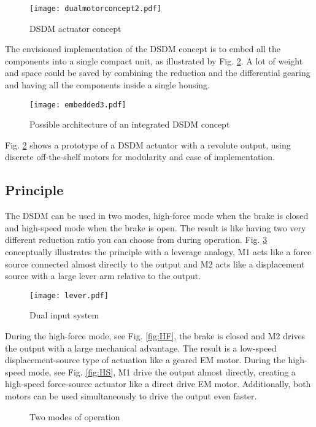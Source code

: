 \begin{figure}[H]
	\centering
		\texttt{[image: dualmotorconcept2.pdf]}
	\caption{DSDM actuator concept}
	\label{fig:dualmotorconcept}
\end{figure}

The envisioned implementation of the DSDM concept is to embed all the components into a single compact unit, as illustrated by Fig. \ref{fig:embedded}. A lot of weight and space could be saved by combining the reduction and the differential gearing and having all the components inside a single housing. 


\begin{figure}[H]
	\centering
		\texttt{[image: embedded3.pdf]}
	\caption{Possible architecture of an integrated DSDM concept}
	\label{fig:embedded}
\end{figure}

Fig. \ref{fig:embedded} shows a prototype of a DSDM actuator with a revolute output, using discrete off-the-shelf motors for modularity and ease of implementation.


\subsection{Principle}
\label{sec:princ}



The DSDM can be used in two modes, high-force mode when the brake is closed and high-speed mode when the brake is open. The result is like having two very different reduction ratio you can choose from during operation. Fig. \ref{fig:lever} conceptually illustrates the principle with a leverage analogy, M1 acts like a force source connected almost directly to the output and M2 acts like a displacement source with a large lever arm relative to the output. 
%
\begin{figure}[H]
	\centering
		\texttt{[image: lever.pdf]}
	\caption{Dual input system}
	\label{fig:lever}
\end{figure}
%
During the high-force mode, see Fig. \ref{fig:HF}, the brake is closed and M2 drives the output with a large mechanical advantage. The result is a low-speed displacement-source type of actuation like a geared EM motor. During the high-speed mode, see Fig. \ref{fig:HS}, M1 drive the output almost directly, creating a high-speed force-source actuator like a direct drive EM motor. Additionally, both motors can be used simultaneously to drive the output even faster.
%
\begin{figure}[H]
        \centering
        \caption{Two modes of operation}\label{fig:opmode}
\end{figure}

